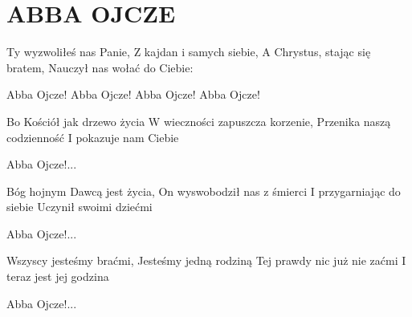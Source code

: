\documentclass[../../../songbook.tex]{subfiles}
\begin{document}
\TabPositions{8cm} %
\section*{ABBA OJCZE}
{}
\vspace{0.5cm}
Ty wyzwoliłeś nas Panie,			 \newline
Z kajdan i samych siebie,			 \newline
A Chrystus, stając się bratem,		 \newline
Nauczył nas wołać do Ciebie:		 \newline

\-\hspace{1cm} Abba Ojcze! 		 \newline
\-\hspace{1cm} Abba Ojcze! 		 \newline
\-\hspace{1cm} Abba Ojcze!		 \newline
\-\hspace{1cm} Abba Ojcze!		 \newline

Bo Kościół jak drzewo życia \newline
W wieczności zapuszcza korzenie, \newline
Przenika naszą codzienność \newline
I pokazuje nam Ciebie \newline

\-\hspace{1cm} Abba Ojcze!... \newline

Bóg hojnym Dawcą jest życia, \newline
On wyswobodził nas z śmierci \newline
I przygarniając do siebie \newline
Uczynił swoimi dziećmi \newline

\-\hspace{1cm} Abba Ojcze!... \newline

Wszyscy jesteśmy braćmi, \newline
Jesteśmy jedną rodziną \newline
Tej prawdy nic już nie zaćmi \newline
I teraz jest jej godzina \newline

\-\hspace{1cm} Abba Ojcze!... \newline
\end{document}
